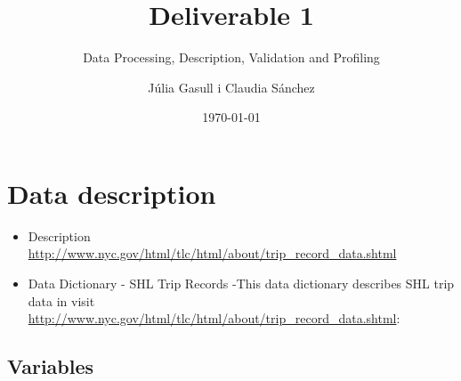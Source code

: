 \documentclass[
  18pt,
  a4paper]{article}
\title{Deliverable 1}
\subtitle{Data Processing, Description, Validation and Profiling}
\author{Júlia Gasull i Claudia Sánchez}
\date{\today}
\providecommand{\tightlist}{%
  \setlength{\itemsep}{0pt}\setlength{\parskip}{0pt}}
\begin{document}
\maketitle

{
\setcounter{tocdepth}{4}
\tableofcontents
}
\hypertarget{data-description}{%
\section{Data description}\label{data-description}}

\begin{itemize}
\tightlist
\item
  Description
  \url{http://www.nyc.gov/html/tlc/html/about/trip_record_data.shtml}
\item
  Data Dictionary - SHL Trip Records -This data dictionary describes SHL
  trip data in visit
  \url{http://www.nyc.gov/html/tlc/html/about/trip_record_data.shtml}:
\end{itemize}

\hypertarget{variables}{%
\subsection{Variables}\label{variables}}
\end{document}

